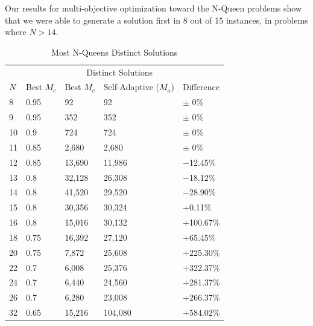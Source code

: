 \documentclass[conference]{IEEEtran}
\begin{document}
Our results for multi-objective optimization toward the N-Queen problems show that we were able to generate a solution first in 8 out of 15 instances, in problems where $N > 14$.

% 
%
\begin{table}
\centering
\caption{Most N-Queens Distinct Solutions}
\begin{tabular}{|l|l|l|l|l|} \hline
&               &  \multicolumn{2}{c|}{Distinct Solutions}& \\ \cline{3-4}
$N$&  Best $M_{c}$&  Best $M_{c}$&    Self-Adaptive ($M_{a}$)&    Difference\\ \hline
8&  0.95&          92&              92&                         $\pm$ 0\% \\ \hline                        
9&  0.95&          352&             352&                        $\pm$ 0\% \\ \hline
10& 0.9&           724&             724&                        $\pm$ 0\% \\ \hline
11& 0.85&          2,680&           2,680&                      $\pm$ 0\% \\ \hline
12& 0.85&          13,690&          11,986&                     $-$12.45\% \\ \hline
13& 0.8&           32,128&          26,308&                     $-$18.12\% \\ \hline
14& 0.8&           41,520&          29,520&                     $-$28.90\% \\ \hline
15& 0.8&           30,356&          30,324&                     $+$0.11\% \\ \hline
16& 0.8&           15,016&          30,132&                     $+$100.67\% \\ \hline
18& 0.75&          16,392&          27,120&                     $+$65.45\% \\ \hline
20& 0.75&          7,872&           25,608&                     $+$225.30\% \\ \hline
22& 0.7&           6,008&           25,376&                     $+$322.37\% \\ \hline
24& 0.7&           6,440&           24,560&                     $+$281.37\% \\ \hline
26& 0.7&           6,280&           23,008&                     $+$266.37\% \\ \hline
32& 0.65&          15,216&          104,080&                    $+$584.02\% \\ \hline
\end{tabular}
\label{table:mostsol}
\end{table}
\end{document}
